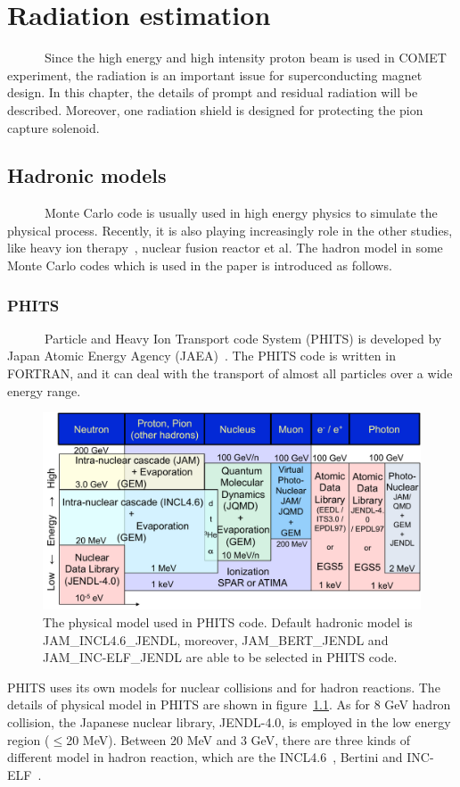 \chapter{Radiation estimation}
~~~~~~Since the high energy and high intensity proton beam is used in COMET experiment, the radiation is an important issue for superconducting magnet design.
In this chapter, the details of prompt and residual radiation will be described.
Moreover, one radiation shield is designed for protecting the pion capture solenoid.

 \section{Hadronic models}
~~~~~~Monte Carlo code is usually used in high energy physics to simulate the physical process.
Recently, it is also playing increasingly role in the other studies, like heavy ion therapy~\cite{therapy}, nuclear fusion reactor et al.
The hadron model in some Monte Carlo codes which is used in the paper is introduced as follows.

  \subsection{PHITS}
~~~~~~Particle and Heavy Ion Transport code System (PHITS) is developed by Japan Atomic Energy Agency (JAEA)~\cite{phits}.
The PHITS code is written in FORTRAN, and it can deal with the transport of almost all particles over a wide energy range. 
\begin{figure}[H]
 \centering
 \includegraphics[scale=0.43]{chapter3/fig/physicalmodel.pdf}
 \caption{The physical model used in PHITS code. Default hadronic model is JAM\_INCL4.6\_JENDL, moreover, JAM\_BERT\_JENDL and JAM\_INC-ELF\_JENDL are able to be selected in PHITS code.}
 \label{phitsmodel}
\end{figure}
PHITS uses its own models for nuclear collisions and for hadron reactions.
The details of physical model in PHITS are shown in figure~\ref{phitsmodel}.
As for 8 GeV hadron collision, the Japanese nuclear library, JENDL-4.0, is employed in the low energy region ($\le$20 MeV).
Between 20 MeV and 3 GeV, there are three kinds of different model in hadron reaction, which are the INCL4.6~\cite{incl}, Bertini and INC-ELF~\cite{incelf}.

